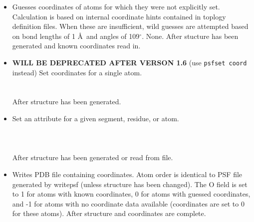 \begin{itemize}
\item {}
{Guesses coordinates of atoms for which they were not explicitly set.
Calculation is based on internal coordinate hints contained in toplogy
definition files.  When these are insufficient, wild guesses are attempted
based on bond lengths of 1 \AA\ and angles of 109$^\circ$.}
{None.}
{After stucture has been generated and known coordinates read in.}

\item {}
{\textbf{WILL BE DEPRECATED AFTER VERSON 1.6} (use {\tt psfset coord} instead) Set coordinates for a single atom.}
{\\
\\
\\
}
{After structure has been generated.}

\item {}
{Set an attribute for a given segment, residue, or atom.}
{\\
\\
\\
\\
}
{After structure has been generated or read from file.}

\item {}
{Writes PDB file containing coordinates.  Atom order is identical to
PSF file generated by writepsf (unless structure has been changed).
The O field is set to 1 for atoms with known coordinates, 0 for atoms
with guessed coordinates, and -1 for atoms with no coordinate data
available (coordinates are set to 0 for these atoms).}
{}
{After structure and coordinates are complete.}


\end{itemize}
